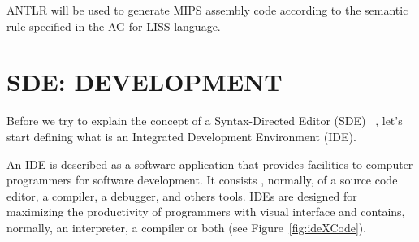 \documentclass[
  oneside,
  11pt, a4paper,
  footinclude=true,
  headinclude=true,
  cleardoublepage=empty
]{scrbook}
\begin{document}
ANTLR will be used to generate MIPS assembly code according to the semantic rule specified in the AG for LISS language.






\chapter{SDE: DEVELOPMENT}

Before we try to explain the concept of a Syntax-Directed Editor (SDE) ~\citep{RT89b,Ko05,alsCH10a,TR81a,RMT86a,RT89a,AHW89}, let's start defining what is an Integrated Development Environment (IDE).

An IDE is described as a software application that provides facilities to computer programmers for software development. It consists , normally, of a source code editor, a compiler, a debugger, and others tools.
IDEs are designed for maximizing the productivity of programmers with visual interface and contains, normally, an interpreter, a compiler or both (see Figure~\ref{fig:ideXCode}).
\end{document}
